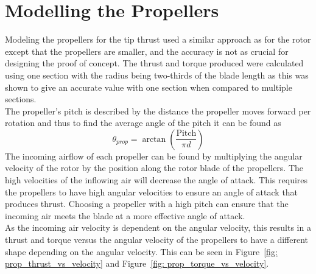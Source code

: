     \section{Modelling the Propellers}
        Modeling the propellers for the tip thrust used a similar approach as for the rotor except that the propellers are smaller, and the accuracy is not as crucial for designing the proof of concept. The thrust and torque produced were calculated using one section with the radius being two-thirds of the blade length as this was shown to give an accurate value with one section when compared to multiple sections. \\
        The propeller's pitch is described by the distance the propeller moves forward per rotation and thus to find the average angle of the pitch it can be found as \[\theta_{prop} = \arctan\left(\frac{\text{Pitch}}{\pi d}\right)\]
        The incoming airflow of each propeller can be found by multiplying the angular velocity of the rotor by the position along the rotor blade of the propellers. The high velocities of the inflowing air will decrease the angle of attack. This requires the propellers to have high angular velocities to ensure an angle of attack that produces thrust. Choosing a propeller with a high pitch can ensure that the incoming air meets the blade at a more effective angle of attack. 
        \\
        As the incoming air velocity is dependent on the angular velocity, this results in a thrust and torque versus the angular velocity of the propellers to have a different shape depending on the angular velocity. This can be seen in  Figure~\ref{fig: prop_thrust_vs_velocity} and Figure~\ref{fig: prop_torque_vs_velocity}. 

